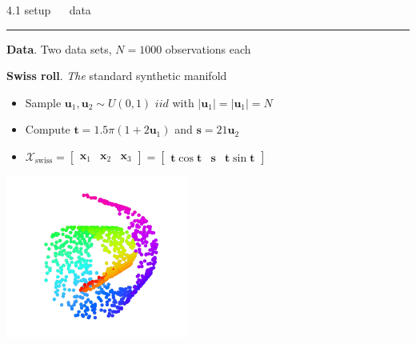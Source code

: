 \documentclass[11pt, compress, t, notes = noshow, xcolor = table, 
aspectratio = 1610]{beamer}
\newcommand{\highlight}[1]{\textcolor{highlightcol}{\textbf{#1}}}
\newcommand{\flexitem}[1]{\item[$\highlight{#1}$]}
\newcommand{\X}{\mathcal{X}}
\newcommand{\x}{\bm{x}}
\begin{document}
\LARGE
\begin{frame}{\textcolor{gray!90}{4.1 setup} ~~ data}
\normalsize
\vspace{-0.5cm}
\noindent \textcolor{gray!90}{\rule{\textwidth}{1pt}}
\smallskip

\textbf{Data}. Two data sets, $N = 1000$ observations each

\begin{minipage}[b]{0.65\textwidth}
  \textbf{Swiss roll}. \textit{The} standard synthetic manifold
  \begin{itemize}
    \flexitem{1} Sample $\bm{u}_1, \bm{u}_2 \sim U(0, 1)$ 
    $\mathit{ iid}$ with $\rvert \bm{u}_1 \rvert = \rvert \bm{u}_1 \rvert = N$
    \flexitem{2} Compute $\bm{t} = 1.5 \pi (1 + 2\bm{u}_1)$ and 
    $\bm{s} = 21 \bm{u}_2$
    \flexitem{3} $\X_{\text{swiss}} = 
    \begin{bmatrix} \x_1 & \x_2 & \x_3 \end{bmatrix} =
    \begin{bmatrix} \bm{t} \cos{\bm{t}} & \bm{s} & 
    \bm{t} \sin{\bm{t}} \end{bmatrix}$ 
  \end{itemize}
\end{minipage}%
\begin{minipage}[b]{0.35\textwidth}
  \centering
  \includegraphics[trim = 60 30 40 -20, clip, %
    width = 0.45\textwidth]{figures/swiss-roll}
\end{minipage}

\vspace{0.3cm}


\end{frame}
\end{document}
